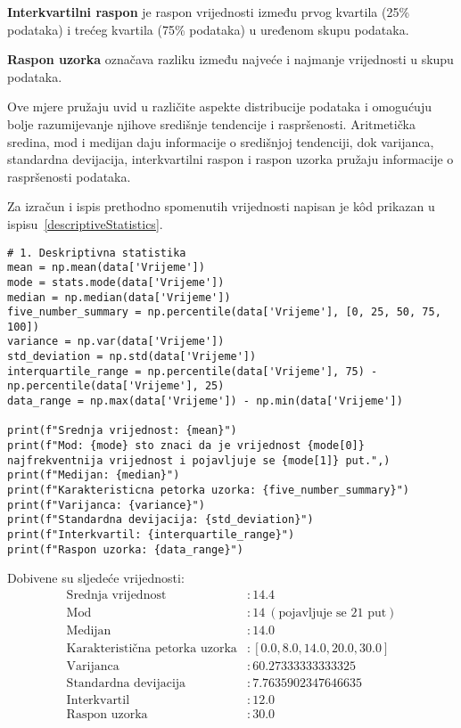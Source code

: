 \textbf{Interkvartilni raspon} je raspon vrijednosti između prvog kvartila (25\% podataka) i trećeg kvartila (75\% podataka) u uređenom skupu podataka.

\textbf{Raspon uzorka} označava razliku između najveće i najmanje vrijednosti u skupu podataka.

Ove mjere pružaju uvid u različite aspekte distribucije podataka i omogućuju bolje razumijevanje njihove središnje tendencije i raspršenosti. Aritmetička sredina, mod i medijan daju informacije o središnjoj tendenciji, dok varijanca, standardna devijacija, interkvartilni raspon i raspon uzorka pružaju informacije o raspršenosti podataka.

Za izračun i ispis prethodno spomenutih vrijednosti napisan je k\^od prikazan u ispisu~\ref{descriptiveStatistics}.

\begin{lstlisting}[caption={Izračun i ispis traženih osnovnih pojmova statističke analize podataka}, label=descriptiveStatistics]
# 1. Deskriptivna statistika
mean = np.mean(data['Vrijeme'])
mode = stats.mode(data['Vrijeme'])
median = np.median(data['Vrijeme'])
five_number_summary = np.percentile(data['Vrijeme'], [0, 25, 50, 75, 100])
variance = np.var(data['Vrijeme'])
std_deviation = np.std(data['Vrijeme'])
interquartile_range = np.percentile(data['Vrijeme'], 75) - np.percentile(data['Vrijeme'], 25)
data_range = np.max(data['Vrijeme']) - np.min(data['Vrijeme'])

print(f"Srednja vrijednost: {mean}")
print(f"Mod: {mode} sto znaci da je vrijednost {mode[0]} najfrekventnija vrijednost i pojavljuje se {mode[1]} put.",)
print(f"Medijan: {median}")
print(f"Karakteristicna petorka uzorka: {five_number_summary}")
print(f"Varijanca: {variance}")
print(f"Standardna devijacija: {std_deviation}")
print(f"Interkvartil: {interquartile_range}")
print(f"Raspon uzorka: {data_range}")
\end{lstlisting}

Dobivene su sljedeće vrijednosti:
\begin{align*}
\text{Srednja vrijednost} &: 14.4 \\
\text{Mod} &: 14 \ (\text{pojavljuje se 21 put}) \\
\text{Medijan} &: 14.0 \\
\text{Karakteristična petorka uzorka} &: [0.0, 8.0, 14.0, 20.0, 30.0] \\
\text{Varijanca} &: 60.27333333333325 \\
\text{Standardna devijacija} &: 7.7635902347646635 \\
\text{Interkvartil} &: 12.0 \\
\text{Raspon uzorka} &: 30.0 \\
\end{align*}

